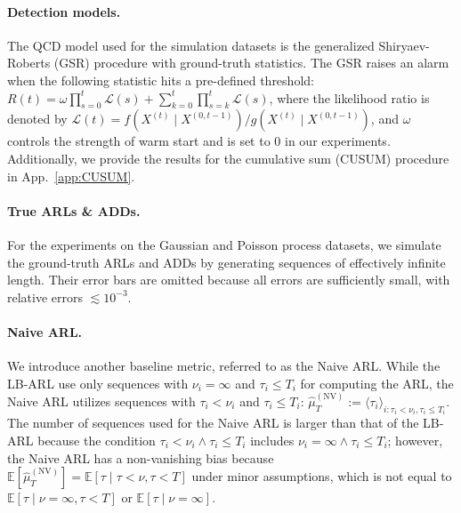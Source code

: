 \documentclass{article}
\theoremstyle{plain}
\theoremstyle{definition}
\theoremstyle{remark}
\def\mbe{\mathbb{E}}
\begin{document}
\paragraph{Detection models.}
The QCD model used for the simulation datasets is the generalized Shiryaev-Roberts (GSR) procedure with ground-truth statistics. 
The GSR raises an alarm when the following statistic hits a pre-defined threshold: $R(t) =\omega \prod_{s=0}^t \mathcal{L}(s)+\sum_{k=0}^t \prod_{s=k}^t \mathcal{L}(s)$, 
where the likelihood ratio is denoted by $\mathcal{L}(t)=f\left(X^{(t)} \mid X^{(0, t-1)}\right) / g\left(X^{(t)} \mid X^{(0,t-1)}\right)$, and $\omega$ controls the strength of warm start and is set to $0$ in our experiments.
Additionally, we provide the results for the cumulative sum (CUSUM) procedure in App.~\ref{app:CUSUM}.

\paragraph{True ARLs \& ADDs.}
For the experiments on the Gaussian and Poisson process datasets, we simulate the ground-truth ARLs and ADDs by generating sequences of effectively infinite length.
Their error bars are omitted because all errors are sufficiently small, with relative errors $\lesssim 10^{-3}$.


\paragraph{Naive ARL.}
We introduce another baseline metric, referred to as the Naive ARL.
While the LB-ARL use only sequences with $\nu_i=\infty$ and $\tau_i \leq T_i$ for computing the ARL, the Naive ARL utilizes sequences with $\tau_i < \nu_i$ and $\tau_i \leq T_i$: $\hat{\mu}_T^\mathrm{(NV)} := \langle \tau_i \rangle_{i:\tau_i < \nu_i, \tau_i \leq T_i}$.
The number of sequences used for the Naive ARL is larger than that of the LB-ARL because the condition $\tau_i < \nu_i \wedge \tau_i \leq T_i$ includes $\nu_i = \infty \wedge \tau_i \leq T_i$; 
however, the Naive ARL has a non-vanishing bias because $\mbe [\hat{\mu}_T^\mathrm{(NV)}] = \mbe[\tau \mid \tau < \nu , \tau < T]$ under minor assumptions, which is not equal to $\mbe[\tau \mid \nu = \infty, \tau < T]$ or $\mbe[\tau \mid \nu = \infty]$.
\end{document}
